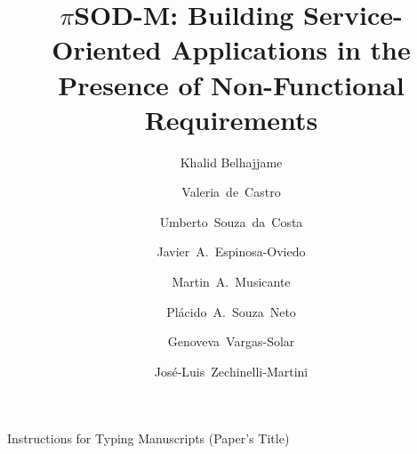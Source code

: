 \documentclass{ws-ijseke}
\newcommand{\pisodm}[0]{$\pi$SOD-M\xspace}
\begin{document}
{Instructions for Typing Manuscripts (Paper's Title)}

%
\catchline{}{}{}{}{}
%

\title{\pisodm: Building Service-Oriented Applications in the Presence of Non-Functional Requirements}

\author{Khalid Belhajjame}
\address{Universit\'e de Paris - Dauphine -- Paris, France\\
}

\author{Valeria~de~Castro} 
\address{Universidad Rey Juan Carlos -- M\'{o}stoles, Spain\\
}

\author{Umberto~Souza~da~Costa} 
\address{Universidade Federal do Rio Grande do Norte -- Natal, Brazil\\
}

\author{Javier~A.~Espinosa-Oviedo} 
\address{Universidad de las Am\'ericas-Puebla, LAFMIA -- Cholula, Mexico\\
}

\author{Martin~A.~Musicante} 
\address{Universidade Federal do Rio Grande do Norte -- Natal, Brazil\\
}

\author{Pl\'acido~A.~Souza~Neto} 
\address{Instituto Federal de Educa\c{c}\~{a}o, Ci\^{e}ncia e Tecnologia do Rio Grande do Norte -- Natal, Brazil\\
}

\author{Genoveva~Vargas-Solar} 
\address{CNRS, LIG-LAFMIA, Saint Martin d'H\`eres, France\\
}

\author{Jos\'e-Luis~Zechinelli-Martini}
\address{Universidad de las Am\'ericas-Puebla, LAFMIA -- Cholula, Mexico\\
}

\maketitle

\begin{history}
\end{history}
\end{document}
